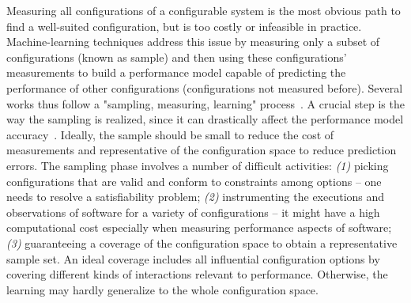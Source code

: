 Measuring all configurations of a configurable system is the most obvious path to \eg find a well-suited configuration, but is too costly or infeasible in practice. 
Machine-learning techniques address this issue by measuring only a subset of configurations (known as sample) and then using these configurations' measurements to build a performance model capable of predicting the performance of other configurations (\ie configurations not measured before).
Several works thus follow a "sampling, measuring, learning" process~\cite{julianasurvey,jamshidi2018,jamshidi2017a,jamshidi2017b,jamshidi2019,sarkar2015,valov2015,valov2017,jehooh2017,temple2016,amand2019,guo2013ASE,nair2017,nair2018a,kolesnikov2018,siegmund2015FSE}. 
 A crucial step is the way the sampling is realized, since it can drastically affect the performance model accuracy~\cite{julianasurvey,kaltenecker2019}. Ideally, the sample should be small to reduce the cost of measurements and representative of the configuration space to reduce prediction errors. 
 The sampling phase involves a number of difficult activities: \textit{(1)} picking configurations that are valid and conform to constraints among options -- one needs to resolve a satisfiability problem; \textit{(2)} instrumenting the executions and observations of software for a variety of configurations -- it might have a high computational cost especially when measuring performance aspects of software; \textit{(3)} guaranteeing a coverage of the configuration space to obtain a representative sample set.
An ideal coverage includes all influential configuration options by covering different kinds of interactions relevant to performance.
Otherwise, the learning may hardly generalize to the whole configuration space. 

